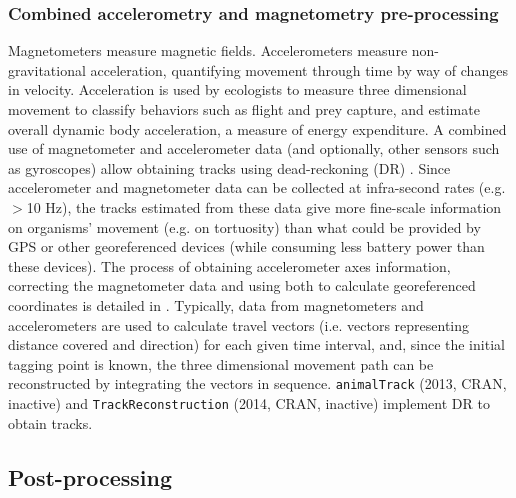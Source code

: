 \documentclass[a4paper,12pt]{article}
\newcommand{\Rpkg}[1]{\texttt{#1}}
\begin{document}
	
	\subsubsection*{Combined accelerometry and magnetometry pre-processing} 
	
	Magnetometers measure magnetic fields. Accelerometers measure non-gravitational acceleration, quantifying movement through time by way of changes in velocity. Acceleration is used by ecologists to measure three dimensional movement to classify behaviors such as flight and prey capture, and estimate overall dynamic body acceleration, a measure of energy expenditure. 
	A combined use of magnetometer and accelerometer data (and optionally, other sensors such as gyroscopes) allow obtaining tracks using dead-reckoning (DR) \citep{Wilson2007,Bidder2015,Williams2017}. Since accelerometer and magnetometer data can be collected at infra-second rates (e.g. $>$10 Hz), the tracks estimated from these data give more fine-scale information on organisms' movement (e.g. on tortuosity) than what could be provided by GPS or other georeferenced devices (while consuming less battery power than these devices). The process of obtaining accelerometer axes information, correcting the magnetometer data and using both to calculate georeferenced coordinates is detailed in \cite{Bidder2015}. Typically, data from magnetometers and accelerometers are used to calculate travel vectors (i.e. vectors representing distance covered and direction) for each given time interval, and, since the initial tagging point is known, the three dimensional movement path can be reconstructed by integrating the vectors in sequence. \Rpkg{animalTrack} (2013, CRAN, inactive) \citep{RanimalTrack} and \Rpkg{TrackReconstruction} (2014, CRAN, inactive) \citep{RTrackReconstruction} implement DR to obtain tracks. 
	
	
	\subsection*{Post-processing}
	
\end{document}
